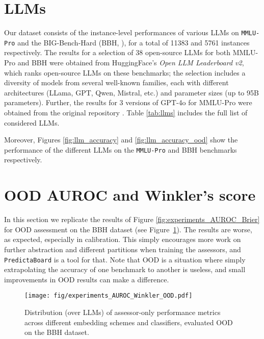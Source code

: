 \documentclass[11pt]{article}
\newcommand{\predbench}{{\tt PredictaBoard}\xspace}
\begin{document}
\section{LLMs}

Our dataset consists of the instance-level performances of various LLMs on {\tt MMLU-Pro} \cite{wang2024mmluprorobustchallengingmultitask}  and the BIG-Bench-Hard (BBH, \citealp{suzgun2022challenging}), for a total of 11383 and 5761 instances respectively. The results for a selection of 38 open-source LLMs for both  MMLU-Pro and BBH were obtained from HuggingFace's \textit{Open LLM Leaderboard v2}, which ranks open-source LLMs on these benchmarks; 
the selection includes a diversity of models from several well-known families, each with different architectures (LLama, GPT, Qwen, Mistral, etc.) and parameter sizes (up to 95B parameters). 
Further, the results for 3 versions of GPT-4o for MMLU-Pro were obtained from the original repository \cite{wang2024mmluprorobustchallengingmultitask}. Table \ref{tab:llms} includes the full list of considered LLMs.

Moreover, Figures \ref{fig:llm_accuracy} and \ref{fig:llm_accuracy_ood} show the performance of the different LLMs on the {\tt MMLU-Pro} and  BBH benchmarks respectively. 

\section{OOD AUROC and Winkler's score}
\label{app:ood_res}

In this section we replicate the results of Figure \ref{fig:experiments_AUROC_Brier} for OOD assessment on the BBH dataset (see Figure~\ref{fig:experiments_AUROC_Brier_OOD}). 
The results are worse, as expected, especially in calibration. This simply encourages more work on further abstraction and different partitions when training the assessors, and \predbench is a tool for that. Note that OOD is a situation where simply extrapolating the accuracy of one benchmark to another is useless, and small improvements in OOD results can make a difference. 

\begin{figure}[tb]
    \centering
    \texttt{[image: fig/experiments\_AUROC\_Winkler\_OOD.pdf]}
    \caption{Distribution (over LLMs) of assessor-only performance metrics across different embedding schemes
    and classifiers, evaluated OOD on the BBH dataset.}
    \label{fig:experiments_AUROC_Brier_OOD}
\end{figure}
\end{document}
